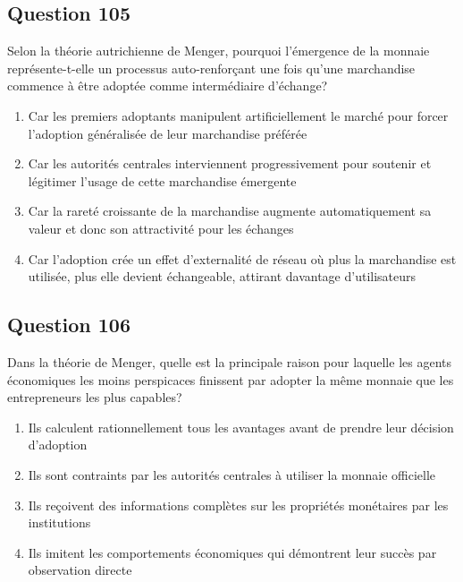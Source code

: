 \documentclass[12pt,a4paper]{article}
\begin{document}
\bigskip


\subsection*{Question 105}
Selon la théorie autrichienne de Menger, pourquoi l'émergence de la monnaie représente-t-elle un processus auto-renforçant une fois qu'une marchandise commence à être adoptée comme intermédiaire d'échange?

\begin{enumerate}[label=\Alph*., leftmargin=*]
\item Car les premiers adoptants manipulent artificiellement le marché pour forcer l'adoption généralisée de leur marchandise préférée
\item Car les autorités centrales interviennent progressivement pour soutenir et légitimer l'usage de cette marchandise émergente
\item Car la rareté croissante de la marchandise augmente automatiquement sa valeur et donc son attractivité pour les échanges
\item Car l'adoption crée un effet d'externalité de réseau où plus la marchandise est utilisée, plus elle devient échangeable, attirant davantage d'utilisateurs
\end{enumerate}

\bigskip


\subsection*{Question 106}
Dans la théorie de Menger, quelle est la principale raison pour laquelle les agents économiques les moins perspicaces finissent par adopter la même monnaie que les entrepreneurs les plus capables?

\begin{enumerate}[label=\Alph*., leftmargin=*]
\item Ils calculent rationnellement tous les avantages avant de prendre leur décision d'adoption
\item Ils sont contraints par les autorités centrales à utiliser la monnaie officielle
\item Ils reçoivent des informations complètes sur les propriétés monétaires par les institutions
\item Ils imitent les comportements économiques qui démontrent leur succès par observation directe
\end{enumerate}

\bigskip
\end{document}
